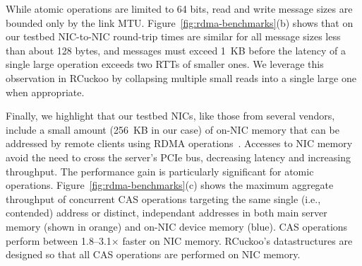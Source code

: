 
While atomic operations are limited to 64 bits, read and write message
sizes are bounded only by the link MTU.
Figure~\ref{fig:rdma-benchmarks}(b) shows that on our testbed
NIC-to-NIC round-trip times are similar for all message sizes
less than about 128 bytes, and
messages must exceed 1~KB before the latency of a single large operation
exceeds two RTTs of smaller ones.  We leverage this
observation in RCuckoo by collapsing multiple small reads into a single
large one when appropriate.


Finally, we highlight that our testbed NICs, like those from several
vendors, include a small amount (256~KB in our case) of on-NIC memory
that can be addressed by remote clients using RDMA
operations~\cite{device-memory}.  Accesses to NIC memory avoid the
need to cross the server's PCIe bus, decreasing latency and increasing
throughput.  The performance gain is particularly significant for
atomic operations.  Figure~\ref{fig:rdma-benchmarks}(c) shows the
maximum aggregate throughput of concurrent CAS operations targeting
the same single (i.e., contended) address or distinct, independant
addresses in both main server memory (shown in orange) and on-NIC
device memory (blue).  CAS operations perform between 1.8--3.1$\times$
faster on NIC memory.  RCuckoo's datastructures are designed so that
all CAS operations are performed on NIC memory.


